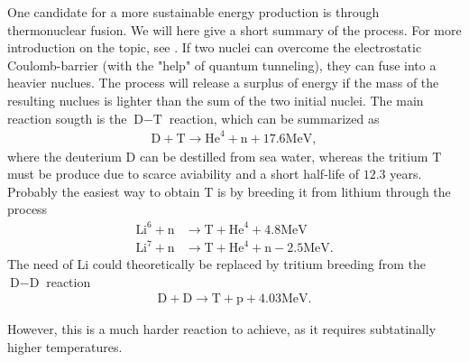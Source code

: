 One candidate for a more sustainable energy production is through thermonuclear fusion.
We will here give a short summary of the process.
For more introduction on the topic, see \cite{Freidberg2008book}.
If two nuclei can overcome the electrostatic Coulomb-barrier (with the "help" of quantum tunneling), they can fuse into a heavier nuclues.
The process will release a surplus of energy if the mass of the resulting nuclues is lighter than the sum of the two initial nuclei.
The main reaction sougth is the $\text{D}-\text{T}$ reaction, which can be summarized as
%
\begin{align*}
    \text{D} + \text{T} \to \text{He}^4 + \text{n} + 17.6 \text{MeV},
\end{align*}
%
where the deuterium $\text{D}$ can be destilled from sea water, whereas the tritium $\text{T}$ must be produce due to scarce aviability and a short half-life of $12.3$ years.
Probably the easiest way to obtain $\text{T}$ is by breeding it from lithium through the process
%
\begin{align*}
    \text{Li}^6 + \text{n} &\to \text{T} + \text{He}^4 + 4.8 \text{MeV}\\
    \text{Li}^7 + \text{n} &\to \text{T} + \text{He}^4 + \text{n} - 2.5 \text{MeV}.
\end{align*}
%
The need of $\text{Li}$ could theoretically be replaced by tritium breeding from the $\text{D}-\text{D}$ reaction
%
\begin{align*}
    \text{D} + \text{D} \to \text{T} + \text{p} + 4.03 \text{MeV}.
\end{align*}
%

However, this is a much harder reaction to achieve, as it requires subtatinally higher temperatures.

